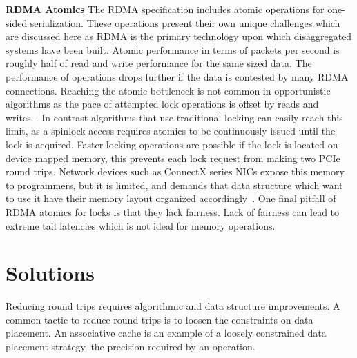 
\textbf{RDMA Atomics}
The RDMA specification includes atomic operations for one-sided serialization.
These operations present their own unique challenges which are discussed here as
RDMA is the primary technology upon which disaggregated systems have been built.
Atomic performance in terms of packets per second is roughly half of read and
write performance for the same sized data. The performance of operations drops
further if the data is contested by many RDMA connections. Reaching the atomic
bottleneck is not common in opportunistic algorithms as the pace of attempted
lock operations is offset by reads and writes~\cite{clover}. In contrast
algorithms that use traditional locking can easily reach this limit, as a
spinlock access requires atomics to be continuously issued until the lock is
acquired. Faster locking operations are possible if the lock is located on
device mapped memory, this prevents each lock request from making two PCIe round
trips. Network devices such as ConnectX series NICs expose this memory to
programmers, but it is limited, and demands that data structure which want to
use it have their memory layout organized accordingly~\cite{sherman}. One final
pitfall of RDMA atomics for locks is that they lack fairness. Lack of fairness can lead to
extreme tail latencies which is not ideal for memory operations.

\section{Solutions}
\label{sec:solutions}


Reducing round trips requires algorithmic and data structure improvements. A
common tactic to reduce round trips is to loosen the constraints on data
placement. An associative cache is an example of a loosely constrained data
placement strategy.  the precision required by an operation.

